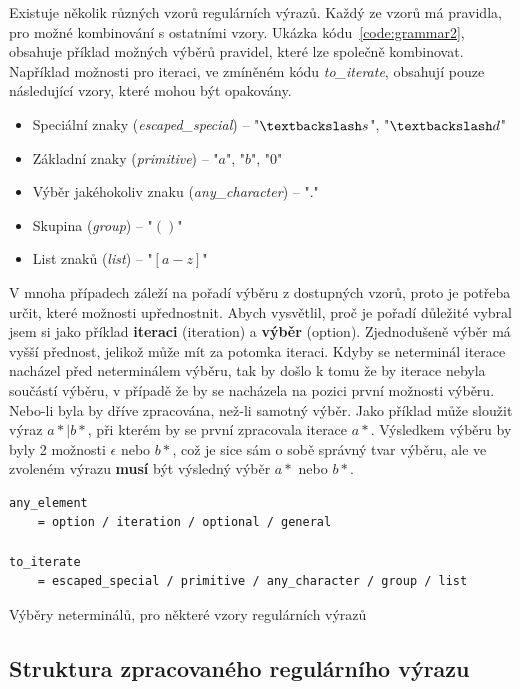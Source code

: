Existuje několik různých vzorů regulárních výrazů.
Každý ze vzorů má pravidla, pro možné kombinování s ostatními vzory.
Ukázka kódu~\ref{code:grammar2}, obsahuje příklad možných výběrů pravidel, které lze společně kombinovat.
Například možnosti pro iteraci, ve zmíněném kódu \textit{to\_iterate}, obsahují pouze následující vzory, které mohou být opakovány.

\begin{itemize}
	\item Speciální znaky (\textit{escaped\_special}) -- "$\textbackslash s$", "$\textbackslash d$"
	\item Základní znaky (\textit{primitive}) -- "$a$", "$b$", "$0$"
	\item Výběr jakéhokoliv znaku (\textit{any\_character}) -- "$.$"
	\item Skupina (\textit{group}) -- "$()$"
	\item List znaků (\textit{list}) -- "$[a-z]$"
\end{itemize}

V mnoha případech záleží na pořadí výběru z dostupných vzorů, proto je potřeba určit, které možnosti upřednostnit.
Abych vysvětlil, proč je pořadí důležité vybral jsem si jako příklad \textbf{iteraci} (iteration) a \textbf{výběr} (option).
Zjednodušeně výběr má vyšší přednost, jelikož může mít za potomka iteraci.
Kdyby se neterminál iterace nacházel před neterminálem výběru, tak by došlo k tomu že by iterace nebyla součástí výběru, v případě že by se nacházela na pozici první možnosti výběru. 
Nebo-li byla by dříve zpracována, než-li samotný výběr.
Jako příklad může sloužit výraz $a*|b*$, při kterém by se první zpracovala iterace $a*$.
Výsledkem výběru by byly 2 možnosti $\epsilon$ nebo $b*$, což je sice sám o sobě správný tvar výběru, ale ve zvoleném výrazu \textbf{musí} být výsledný výběr $a*$ nebo $b*$.

\begin{code}[!ht]
	\begin{verbatim}
any_element 
	= option / iteration / optional / general

to_iterate
	= escaped_special / primitive / any_character / group / list
	\end{verbatim}
	\caption{Výběry neterminálů, pro některé vzory regulárních výrazů}
	\label{code:grammar2}
\end{code}

\subsection*{Struktura zpracovaného regulárního výrazu}

